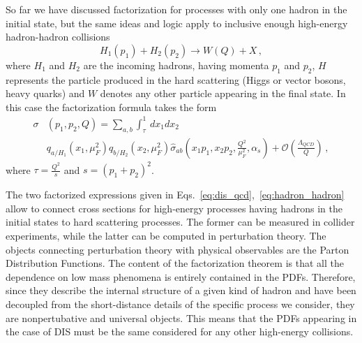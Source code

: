 %
So far we have discussed factorization for processes with only one hadron in the initial state, but
the same ideas and logic apply to inclusive enough high-energy hadron-hadron collisions
$$
H_1\left(p_1\right) + H_2\left(p_2\right) \rightarrow W\left(Q\right) + X\,,
$$
where $H_1$ and $H_2$ are the incoming hadrons, having momenta $p_1$ and $p_2$, $H$ represents
the particle produced in the hard scattering (Higgs or vector bosons, heavy quarks) and $W$
denotes any other particle appearing in the final state. In this case the factorization formula takes the form
\begin{align}
    \label{eq:hadron_hadron}
    \sigma&\left(p_1,p_2,Q\right) = \sum_{a,b}\int_{\tau}^1\, 
    dx_1 dx_2 \, \nonumber \\ 
    &q_{a/H_1}\left(x_1,\mu_F^2\right)q_{b/H_2}\left(x_2,\mu_F^2\right)
    \hat{\sigma}_{ab}\left(x_1p_1,x_2p_2,\frac{Q^2}{\mu_F^2},\alpha_s\right) 
    + \mathcal{O}\left(\frac{\Lambda_{QCD}}{Q}\right)\,,
\end{align}
where $\tau = \frac{Q^2}{s}$ and $s=\left(p_1+p_2\right)^2$.

%
The two factorized expressions given in Eqs.~\eqref{eq:dis_qcd},~\eqref{eq:hadron_hadron}
allow to connect cross sections for high-energy processes having hadrons in the initial states to hard scattering processes.
The former can be measured in collider experiments, while the latter 
can be computed in perturbation theory. The objects connecting perturbation theory with physical observables are
the Parton Distribution Functions.
The content of the factorization theorem is that all the dependence
on low mass phenomena is entirely contained in the PDFs. Therefore, since they describe the internal structure 
of a given kind of hadron and have been decoupled from the short-distance details of
the specific process we consider, they are nonpertubative and universal objects.
This means that the PDFs appearing in the case of DIS must be the same considered for 
any other high-energy collisions.

